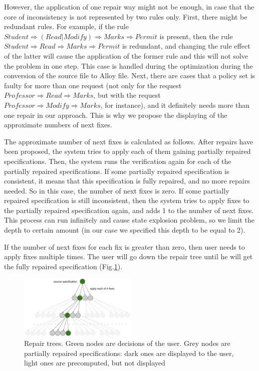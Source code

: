 \documentclass[letterpaper]{acm_proc_article-sp}
\begin{document}
However, the application of one repair way might not be enough, in case that the core of inconsistency is not represented by two rules only. First, there might be redundant rules. For example, if the rule $Student \Rightarrow (Read | Modify) \Rightarrow Marks \Rightarrow Permit$ is present, then the rule $Student \Rightarrow Read \Rightarrow Marks \Rightarrow Permit$ is redundant, and changing the rule effect of the latter will cause the application of the former rule and this will not solve the problem in one step. This case is handled during the optimization during the conversion of the source file to Alloy file. Next, there are cases that a policy set is faulty for more than one request (not only for the request $Professor \Rightarrow Read \Rightarrow Marks$, but with the request  $Professor \Rightarrow  Modify \Rightarrow Marks$, for instance), and it definitely needs more than one repair in our approach. This is why we propose the displaying of the approximate numbers of next fixes.

The approximate number of next fixes is calculated as follows. After repairs have been proposed, the system tries to apply each of them gaining partially repaired specifications. Then, the system runs the verification again for each of the partially repaired specifications. If some partially repaired specification is consistent, it means that this specification is fully repaired, and no more repairs needed. So in this case, the number of next fixes is zero. If some partially repaired specification is still inconsistent, then the system tries to apply fixes to the partially repaired specification again, and adds 1 to the number of next fixes. This process can run infinitely and cause state explosion problem, so we limit the depth to certain amount (in our case we specified this depth to be equal to 2).

If the number of next fixes for each fix is greater than zero, then user needs to apply fixes multiple times. The user will go down the repair tree until he will get the fully repaired specification (Fig.\ref{fig:tree}).

\begin{figure}[h]
\includegraphics[width=0.5\textwidth]{tree.png}
\caption{Repair trees. Green nodes are decisions of the user. Grey nodes are partially repaired specifications: dark ones are displayed to the user, light ones are precomputed, but not displayed}    
  \label{fig:tree}
\end{figure}
\end{document}
